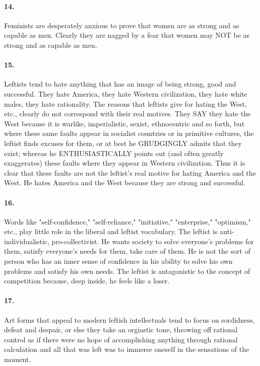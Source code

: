\documentclass[12pt]{book}
\begin{document}
\paragraph{14.} Feminists are desperately anxious to prove that women are as strong and as capable as men. Clearly they are nagged by a fear that women may NOT be as strong and as capable as men.


\paragraph{15.} Leftists tend to hate anything that has an image of being strong, good and successful. They hate America, they hate Western civilization, they hate white males, they hate rationality. The reasons that leftists give for hating the West, etc., clearly do not correspond with their real motives. They SAY they hate the West because it is warlike, imperialistic, sexist, ethnocentric and so forth, but where these same faults appear in socialist countries or in primitive cultures, the leftist finds excuses for them, or at best he GRUDGINGLY admits that they exist; whereas he ENTHUSIASTICALLY points out (and often greatly exaggerates) these faults where they appear in Western civilization. Thus it is clear that these faults are not the leftist's real motive for hating America and the West. He hates America and the West because they are strong and successful.


\paragraph{16.} Words like "self-confidence," "self-reliance," "initiative," "enterprise," "optimism," etc., play little role in the liberal and leftist vocabulary. The leftist is anti-individualistic, pro-collectivist. He wants society to solve everyone's problems for them, satisfy everyone's needs for them, take care of them. He is not the sort of person who has an inner sense of confidence in his ability to solve his own problems and satisfy his own needs. The leftist is antagonistic to the concept of competition because, deep inside, he feels like a loser.


\paragraph{17.} Art forms that appeal to modern leftish intellectuals tend to focus on sordidness, defeat and despair, or else they take an orgiastic tone, throwing off rational control as if there were no hope of accomplishing anything through rational calculation and all that was left was to immerse oneself in the sensations of the moment.
\end{document}
